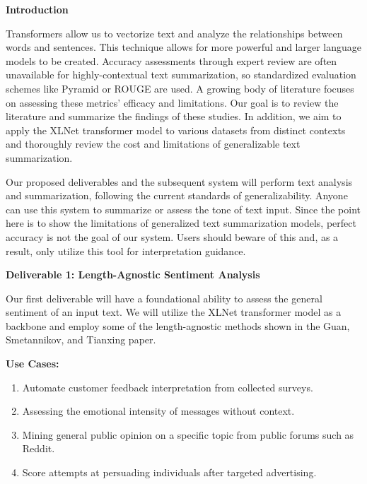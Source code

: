 \begin{large}
    \noindent\textbf{Introduction}
\end{large}

\vspace{5pt}

Transformers allow us to vectorize text and analyze the relationships between words and sentences.
This technique allows for more powerful and larger language models to be created.
Accuracy assessments through expert review are often unavailable for highly-contextual text summarization, so standardized evaluation schemes like Pyramid or ROUGE are used.
A growing body of literature focuses on assessing these metrics' efficacy and limitations.
Our goal is to review the literature and summarize the findings of these studies.
In addition, we aim to apply the XLNet transformer model to various datasets from distinct contexts and thoroughly review the cost and limitations of generalizable text summarization.

\vspace{2pt}

Our proposed deliverables and the subsequent system will perform text analysis and summarization, following the current standards of generalizability.
Anyone can use this system to summarize or assess the tone of text input.
Since the point here is to show the limitations of generalized text summarization models, perfect accuracy is not the goal of our system.
Users should beware of this and, as a result, only utilize this tool for interpretation guidance.

\vspace{5pt}

\begin{large}
    \noindent\textbf{Deliverable 1: Length-Agnostic Sentiment Analysis}
\end{large}

Our first deliverable will have a foundational ability to assess the general sentiment of an input text.
We will utilize the XLNet transformer model as a backbone and employ some of the length-agnostic methods shown in the Guan, Smetannikov, and Tianxing paper\cite{Transformers}. 

\vspace{1pt}

\noindent\textbf{Use Cases:}

\vspace{0pt}

\begin{enumerate}[label=\textbf{\arabic*}, labelsep=0.1em, itemsep=0em, topsep=0em, font=\small]
    \item Automate customer feedback interpretation from collected surveys.
    \item Assessing the emotional intensity of messages without context.
    \item Mining general public opinion on a specific topic from public forums such as Reddit.
    \item Score attempts at persuading individuals after targeted advertising.
\end{enumerate}

